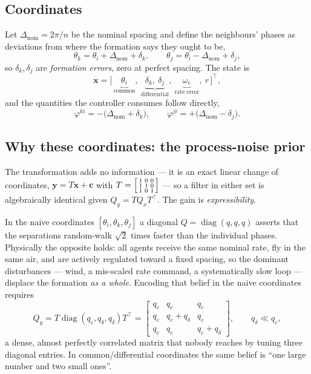 \documentclass[11pt,a4paper]{article}
\begin{document}
\subsection{Coordinates}

Let $\Delta_{\text{nom}} = 2\pi/n$ be the nominal spacing and define the
neighbours' phases as deviations from where the formation says they ought to be,
\begin{equation}
\theta_k = \theta_i + \Delta_{\text{nom}} + \delta_k,
\qquad
\theta_j = \theta_i - \Delta_{\text{nom}} + \delta_j ,
\label{eq:cdcoords}
\end{equation}
so $\delta_k,\delta_j$ are \emph{formation errors}, zero at perfect spacing. The
state is
\begin{equation}
\bm{x} = \big[\,\underbrace{\theta_i}_{\text{common}},\
\underbrace{\delta_k,\ \delta_j}_{\text{differential}},\
\underbrace{\omega_e}_{\text{rate error}},\ r\,\big]^\top ,
\label{eq:cdstate}
\end{equation}
and the quantities the controller consumes follow directly,
\begin{equation}
\varphi^{ki} = -\big(\Delta_{\text{nom}} + \delta_k\big),
\qquad
\varphi^{ji} = +\big(\Delta_{\text{nom}} - \delta_j\big).
\label{eq:cdsep}
\end{equation}

\subsection{Why these coordinates: the process-noise prior}

The transformation adds no information --- it is an exact linear change of
coordinates, $\bm y = T\bm x + \bm c$ with
$T = \begin{bsmallmatrix}1&0&0\\1&1&0\\1&0&1\end{bsmallmatrix}$ --- so a filter
in either set is algebraically identical given $Q_y = TQ_xT^\top$. The gain is
\emph{expressibility}.

In the naive coordinates $[\theta_i,\theta_k,\theta_j]$ a diagonal
$Q=\operatorname{diag}(q,q,q)$ asserts that the separations random-walk
$\sqrt2$ times faster than the individual phases. Physically the opposite holds:
all agents receive the same nominal rate, fly in the same air, and are actively
regulated toward a fixed spacing, so the dominant disturbances --- wind, a
mis-scaled rate command, a systematically slow loop --- displace the formation
\emph{as a whole}. Encoding that belief in the naive coordinates requires
\begin{equation}
Q_y = T\operatorname{diag}(q_c,q_\delta,q_\delta)T^\top =
\begin{bmatrix}
q_c & q_c & q_c \\
q_c & q_c+q_\delta & q_c \\
q_c & q_c & q_c+q_\delta
\end{bmatrix},
\qquad q_\delta \ll q_c ,
\end{equation}
a dense, almost perfectly correlated matrix that nobody reaches by tuning three
diagonal entries. In common/differential coordinates the same belief is ``one
large number and two small ones''.
\end{document}
